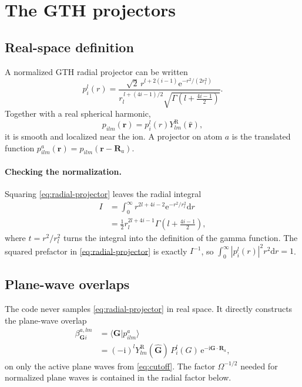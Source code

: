 \documentclass[10pt,twocolumn]{article}
\newcommand{\ii}{\mathrm{i}}
\newcommand{\e}{\mathrm{e}}
\newcommand{\dd}{\mathrm{d}}
\newcommand{\gvec}{\mathbf G}
\newcommand{\rvec}{\mathbf r}
\newcommand{\Rvec}{\mathbf R}
\begin{document}
\section{The GTH projectors}

\subsection{Real-space definition}

A normalized GTH radial projector can be written
\begin{equation}
p_i^l(r)=
\frac{\sqrt{2}\,r^{l+2(i-1)}
\e^{-r^2/(2r_l^2)}}
{r_l^{\,l+(4i-1)/2}
\sqrt{\Gamma\!\left(l+\frac{4i-1}{2}\right)}}.
\label{eq:radial-projector}
\end{equation}
Together with a real spherical harmonic,
\begin{equation}
p_{ilm}(\rvec)=p_i^l(r)Y_{lm}^{\mathrm R}(\hat{\rvec}),
\end{equation}
it is smooth and localized near the ion.  A projector on atom \(a\) is the
translated function \(p^a_{ilm}(\rvec)=p_{ilm}(\rvec-\Rvec_a)\).

\paragraph{Checking the normalization.}
Squaring \cref{eq:radial-projector} leaves the radial integral
\begin{align}
I&=\int_0^\infty r^{2l+4i-2}\e^{-r^2/r_l^2}\dd r\nonumber\\
&=\frac12r_l^{2l+4i-1}
\Gamma\left(l+\frac{4i-1}{2}\right),
\end{align}
where \(t=r^2/r_l^2\) turns the integral into the definition of the gamma
function.  The squared prefactor in \cref{eq:radial-projector} is exactly
\(I^{-1}\), so
\(\int_0^\infty|p_i^l(r)|^2r^2\dd r=1\).

\subsection{Plane-wave overlaps}

The code never samples \cref{eq:radial-projector} in real space.  It directly
constructs the plane-wave overlap
\begin{align}
\beta^{a,lm}_{\gvec i}
&=\langle\gvec|p^a_{ilm}\rangle\\
&=(-\ii)^lY_{lm}^{\mathrm R}(\hat{\gvec})\,
P_i^l(G)\,\e^{-\ii\gvec\cdot\Rvec_a},
\label{eq:beta}
\end{align}
on only the active plane waves from \cref{eq:cutoff}.  The factor
\(\Omega^{-1/2}\) needed for normalized plane waves is contained in the
radial factor below.
\end{document}
